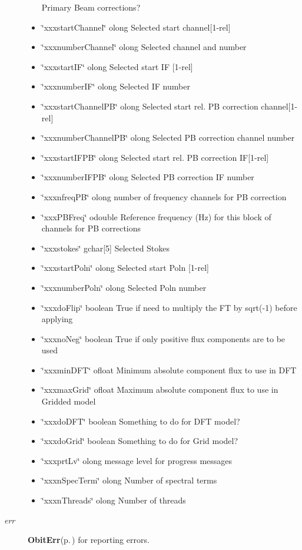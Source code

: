 \begin{Desc}
\begin{description}
\begin{itemize}
Primary Beam corrections? \item \char`\"{}xxxstart\-Channel\char`\"{} olong Selected start channel[1-rel] \item \char`\"{}xxxnumber\-Channel\char`\"{} olong Selected channel and number \item \char`\"{}xxxstart\-IF\char`\"{} olong Selected start IF [1-rel] \item \char`\"{}xxxnumber\-IF\char`\"{} olong Selected IF number \item \char`\"{}xxxstart\-Channel\-PB\char`\"{} olong Selected start rel. PB correction channel[1-rel] \item \char`\"{}xxxnumber\-Channel\-PB\char`\"{} olong Selected PB correction channel number \item \char`\"{}xxxstart\-IFPB\char`\"{} olong Selected start rel. PB correction IF[1-rel] \item \char`\"{}xxxnumber\-IFPB\char`\"{} olong Selected PB correction IF number \item \char`\"{}xxxnfreq\-PB\char`\"{} olong number of frequency channels for PB correction \item \char`\"{}xxx\-PBFreq\char`\"{} odouble Reference frequency (Hz) for this block of channels for PB corrections \item \char`\"{}xxxstokes\char`\"{} gchar[5] Selected Stokes \item \char`\"{}xxxstart\-Poln\char`\"{} olong Selected start Poln [1-rel] \item \char`\"{}xxxnumber\-Poln\char`\"{} olong Selected Poln number \item \char`\"{}xxxdo\-Flip\char`\"{} boolean True if need to multiply the FT by sqrt(-1) before applying \item \char`\"{}xxxno\-Neg\char`\"{} boolean True if only positive flux components are to be used \item \char`\"{}xxxmin\-DFT\char`\"{} ofloat Minimum absolute component flux to use in DFT \item \char`\"{}xxxmax\-Grid\char`\"{} ofloat Maximum absolute component flux to use in Gridded model \item \char`\"{}xxxdo\-DFT\char`\"{} boolean Something to do for DFT model? \item \char`\"{}xxxdo\-Grid\char`\"{} boolean Something to do for Grid model? \item \char`\"{}xxxprt\-Lv\char`\"{} olong message level for progress messages \item \char`\"{}xxxn\-Spec\-Term\char`\"{} olong Number of spectral terms \item \char`\"{}xxxn\-Threads\char`\"{} olong Number of threads \end{itemize}
\item[{\em err}]{\bf Obit\-Err}{\rm (p.\,\pageref{structObitErr})} for reporting errors. \end{description}
\end{Desc}
